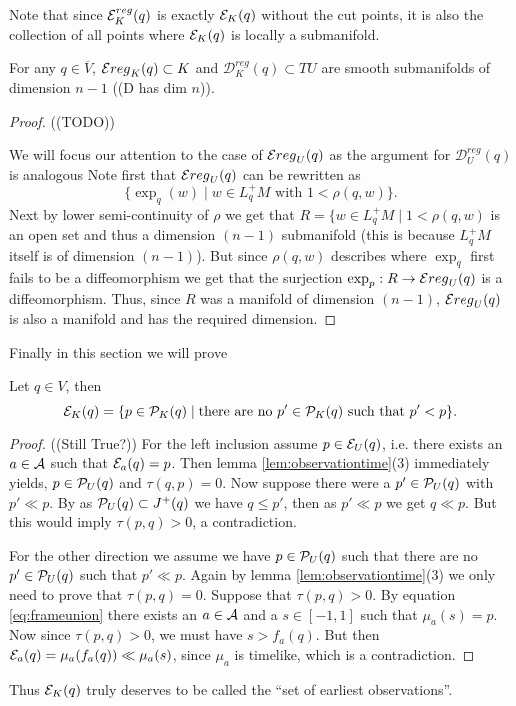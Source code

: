 Note that since $\mc{E}^{reg}_K(q)$ is exactly $\mc{E}_K(q)$ without the cut points, it is also the collection of all points where $\mc{E}_K(q)$ is locally a submanifold.

\begin{proposition} For any $q\in \overline{V}$, $\mc{E}{reg}_K(q)\subset K$ and $\mathcal{D}^{reg}_K(q)\subset TU$ are smooth submanifolds of dimension $n-1$ ((D has dim $n$)).
\end{proposition}
\begin{proof}
((TODO))


We will focus our attention to the case of $\mc{E}{reg}_U(q)$ as the argument for  $\mathcal{D}^{reg}_U(q)$ is analogous
Note first that $\mc{E}{reg}_U(q)$ can be rewritten as 
\[
    \{\exp_q(w) \mid  w\in L^+_qM \text{ with } 1<\rho(q,w)\}.
\]
Next by lower semi-continuity of $\rho$ we get that $R=\{w\in L^+_qM \mid 1<\rho(q,w)$ is an open set and thus a dimension $(n-1)$ submanifold (this is because $L^+_qM$ itself is of dimension $(n-1)$). But since $\rho(q,w)$ describes where $\exp_q$ first fails to be a diffeomorphism we get that the surjection $\exp_p:R\to \mc{E}{reg}_U(q)$ is a diffeomorphism. Thus, since $R$ was a manifold of dimension $(n-1)$, $\mc{E}{reg}_U(q)$ is also a manifold and has the required dimension.
\end{proof}

Finally in this section we will prove
\begin{proposition}\label{prop:seocharact}
Let $q\in V$, then 
\begin{equation*}
    \mc{E}_K(q) = \{ p \in \P_K(q) \mid \text{there are no $p'\in \P_K(q)$ such that $p' < p$} \}.
\end{equation*}
\end{proposition}
\begin{proof}
((Still True?))
For the left inclusion assume $p\in \mc{E}_U(q)$, i.e. there exists an $a\in \ca$ such that $\mc{E}_a(q)=p$. Then lemma \ref{lem:observationtime}(3) immediately yields, $p\in \P_U(q)$ and  $\tau(q,p)=0$. Now suppose there were a $p'\in \P_U(q)$ with $p'\ll p$. By as $\P_U(q)\subset J^+(q)$ we have $q\leq p'$, then as $p'\ll p$ we get $q\ll p$. But this would imply $\tau(p,q)>0$, a contradiction.

For the other direction we assume we have $p \in \P_U(q)$ such that there are no $p'\in\P_U(q)$ such that $p'\ll p$. Again by lemma \ref{lem:observationtime}(3) we only need to prove that $\tau(p,q)=0$. Suppose that $\tau(p,q)>0$. By equation \ref{eq:frameunion} there exists an $a\in \ca$ and a $s\in [-1,1]$ such that $\mu_a(s) = p$. Now since $\tau(p,q)>0$, we must have $s > f_a(q)$. But then $\mc{E}_a(q) = \mu_a(f_a(q)) \ll  \mu_a(s)$, since $\mu_a$ is timelike, which is a contradiction.
\end{proof}
Thus $\mc{E}_K(q)$ truly deserves to be called the \enquote{set of earliest observations}.


